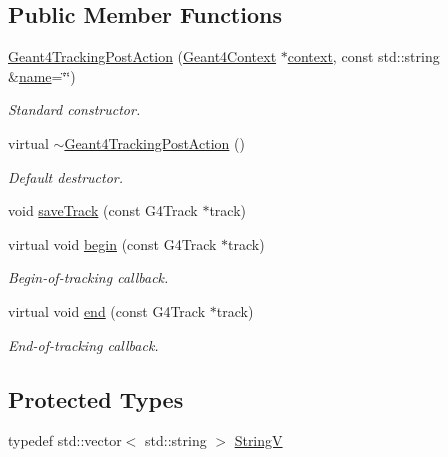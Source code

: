 \subsection*{Public Member Functions}
\begin{DoxyCompactItemize}
\item 
\hyperlink{class_d_d4hep_1_1_simulation_1_1_geant4_tracking_post_action_ae3d8aa2136d0c2604a1704ae8e4193c7}{Geant4\+Tracking\+Post\+Action} (\hyperlink{class_d_d4hep_1_1_simulation_1_1_geant4_context}{Geant4\+Context} $\ast$\hyperlink{class_d_d4hep_1_1_simulation_1_1_geant4_action_aa9d87f0ec2a72b7fc2591b18f98d75cf}{context}, const std\+::string \&\hyperlink{class_d_d4hep_1_1_simulation_1_1_geant4_action_af374e70b014d16afb81dd9d77cc3894b}{name}=\char`\"{}\char`\"{})
\begin{DoxyCompactList}\small\item\em Standard constructor. \end{DoxyCompactList}\item 
virtual \hyperlink{class_d_d4hep_1_1_simulation_1_1_geant4_tracking_post_action_a25395b6df98baa403430c74dfe37b453}{$\sim$\+Geant4\+Tracking\+Post\+Action} ()
\begin{DoxyCompactList}\small\item\em Default destructor. \end{DoxyCompactList}\item 
void \hyperlink{class_d_d4hep_1_1_simulation_1_1_geant4_tracking_post_action_a9ff02148f329e54a340e623d79b1f9c3}{save\+Track} (const G4\+Track $\ast$track)
\item 
virtual void \hyperlink{class_d_d4hep_1_1_simulation_1_1_geant4_tracking_post_action_a3460d57b0bf474e1b83a3302056cf716}{begin} (const G4\+Track $\ast$track)
\begin{DoxyCompactList}\small\item\em Begin-\/of-\/tracking callback. \end{DoxyCompactList}\item 
virtual void \hyperlink{class_d_d4hep_1_1_simulation_1_1_geant4_tracking_post_action_ac64fbbb53136a1696ac45c060fdcde70}{end} (const G4\+Track $\ast$track)
\begin{DoxyCompactList}\small\item\em End-\/of-\/tracking callback. \end{DoxyCompactList}\end{DoxyCompactItemize}
\subsection*{Protected Types}
\begin{DoxyCompactItemize}
\item 
typedef std\+::vector$<$ std\+::string $>$ \hyperlink{class_d_d4hep_1_1_simulation_1_1_geant4_tracking_post_action_ae14809326747530052282a63ea5a362d}{StringV}
\end{DoxyCompactItemize}
